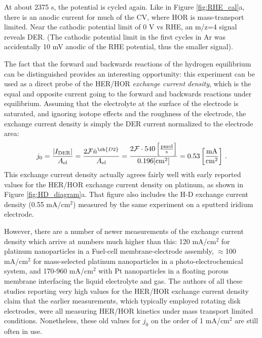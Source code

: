 At about 2375 s, the potential is cycled again. Like in Figure \ref{fig:RHE_cal}a, there is an anodic current for much of the CV, where HOR is mass-transport limited. Near the cathodic potential limit of 0 V vs RHE, an m/z=4 signal reveals DER. (The cathodic potential limit in the first cycles in Ar was accidentally 10 mV anodic of the RHE potential, thus the smaller  signal). 

The fact that the forward and backwards reactions of the hydrogen equilibrium can be distinguished provides an interesting opportunity: this experiment can be used as a direct probe of the HER/HOR \textit{exchange current density}, which is the equal and opposite current going to the forward and backwards reactions under equilibrium. Assuming that the electrolyte at the surface of the electrode is  saturated, and ignoring isotope effects and the roughness of the electrode, the exchange current density is simply the DER current normalized to the electrode area:
\begin{equation}
j_0 = \frac{|I_\text{DER}|}{A_\text{el}} = \frac{2\mathcal{F}\dot{n}^{\ch{D2}}}{A_\text{el}} = \frac{2\mathcal{F}\cdot 540 \left[\frac{\text{pmol}}{\text{s}}\right]}{0.196 [\text{cm}^2]} = 0.53 \left[\frac{\text{mA}}{\text{cm}^2}\right]\,.
\end{equation} 
This exchange current density actually agrees fairly well with early reported values for the HER/HOR exchange current density on platinum\cite{Trasatti1972c, Nørskov2005a}, as shown in Figure \ref{fig:HD_diagram}a. That figure also includes the H-D exchange current density (0.55 mA/cm$^2$) measured by the same experiment on a sputterd iridium electrode.

However, there are a number of newer measurements of the exchange current density which arrive at numbers much higher than this: 120 mA/cm$^2$ for platinum nanoparticles in a Fuel-cell membrane-electrode assembly\cite{Durst2015}, $\approx$100 mA/cm$^2$ for mass-selected platinum nanoparticles in a photo-electrochemical system\cite{Kemppainen2015}, and 170-960 mA/cm$^2$ with Pt nanoparticles in a floating porous membrane interfacing the liquid electrolyte and  gas\cite{Zalitis2017b}. The authors of all these studies reporting very high values for the HER/HOR exchange current density claim that the earlier measurements, which typically employed rotating disk electrodes, were all measuring HER/HOR kinetics under mass transport limited conditions. Nonetheless, these old values for $j_0$ on the order of 1 mA/cm$^2$ are still often in use\cite{Tymoczko2016}.

